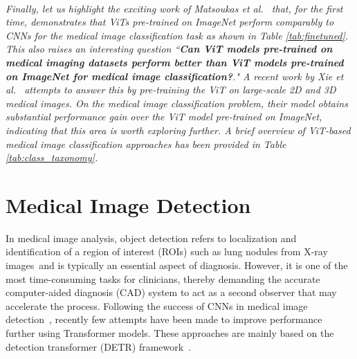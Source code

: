 \documentclass[10pt,journal,compsoc]{IEEEtran}
\begin{document}
\begin{tcolorbox}[top=0.5pt,left=0pt,size=minimal,boxrule = 0pt,breakable, enhanced]
\\
\vspace{0.01em}
\textit{ Finally, let us highlight the exciting work of Matsoukas \textit{et al.}~\cite{matsoukas2021time}
that, for the first time, demonstrates that ViTs pre-trained on ImageNet perform comparably to CNNs for the medical image classification task as shown in Table \ref{tab:finetuned}. This also raises an interesting question ``\textbf{Can ViT models pre-trained on medical imaging datasets perform better than ViT models pre-trained on ImageNet for medical image classification?}."
A recent work by Xie \textit{et al.}~\cite{xie2021unified} attempts to answer this by pre-training the ViT on large-scale 2D and 3D medical images. On the medical image classification problem, their model obtains substantial performance gain over the ViT model pre-trained on ImageNet, indicating that this area is worth exploring further. A brief overview of ViT-based medical image classification approaches has been provided in Table \ref{tab:class_taxonomy}. }
\end{tcolorbox}

\section{Medical Image Detection} \label{sec:det}

In medical image analysis, object detection refers to localization and identification of a region of interest (ROIs) such as lung nodules from X-ray images and is typically an essential aspect of diagnosis. However, it is one of the most time-consuming tasks for clinicians, thereby demanding the accurate computer-aided diagnosis (CAD) system to act as a second observer that may accelerate the process. Following the success of CNNs in medical image detection~\cite{liao2019evaluate,ganatra2021comprehensive}, recently few attempts have been made to improve performance further using Transformer models. These approaches are mainly based on the detection transformer (DETR) framework~\cite{zhu2020deformable}.
\end{document}
